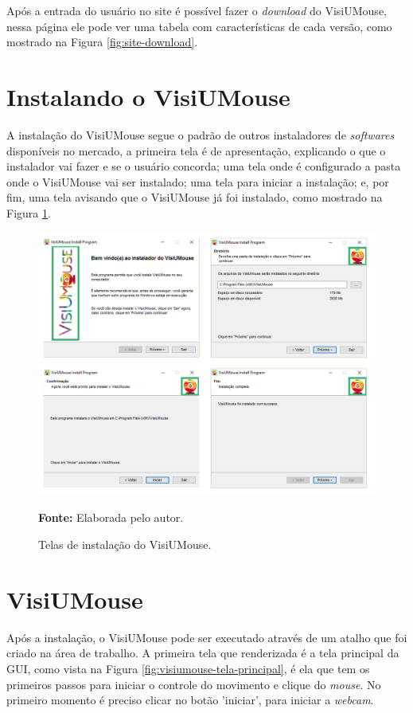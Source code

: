 Após a entrada do usuário no site é possível fazer o \textit{download} do VisiUMouse, nessa página ele pode ver uma tabela com características de cada versão, como mostrado na Figura \ref{fig:site-download}.


\section{Instalando o VisiUMouse}
A instalação do VisiUMouse segue o padrão de outros instaladores de \textit{softwares} disponíveis no mercado, a primeira tela é de apresentação, explicando o que o instalador vai fazer e se o usuário concorda; uma tela onde é configurado a pasta onde o VisiUMouse vai ser instalado; uma tela para iniciar a instalação; e, por fim, uma tela avisando que o VisiUMouse já foi instalado, como mostrado na Figura \ref{fig:visiumouse-instalador}.

\begin{figure}[H]
\caption{Telas de instalação do VisiUMouse.} 
\centering \includegraphics[scale=0.45]{img/software-instalador.png}

{\fontsize{11}{11}\selectfont \textbf{Fonte:} Elaborada pelo autor.}
\label{fig:visiumouse-instalador}
\end{figure}

\section{VisiUMouse}
Após a instalação, o VisiUMouse pode ser executado através de um atalho que foi criado na área de trabalho. A primeira tela que renderizada é a tela principal da GUI, como vista na Figura \ref{fig:visiumouse-tela-principal}, é ela que tem os primeiros passos para iniciar o controle do movimento e clique do \textit{mouse}. No primeiro momento é preciso clicar no botão 'iniciar', para iniciar a \textit{webcam}.

